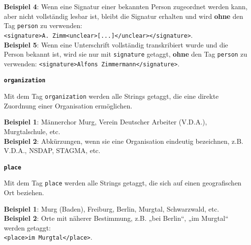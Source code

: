 \documentclass[12pt, a4paper, ngerman, bidi=default]{article}
\begin{document}
\begin{description}
    \textbf{ Beispiel 4}: Wenn eine Signatur einer bekannten Person zugeordnet werden kann, aber nicht vollständig lesbar ist, bleibt die Signatur erhalten und wird \textbf{ohne} den Tag \texttt{\colorbox{person}{person}} zu verwenden: \\ 
    \colorbox{VeryLightGray}{\texttt{\textless signature\textgreater A. Zimm\textless unclear\textgreater [...]\textless /unclear\textgreater\textless /signature\textgreater}.} \\  
    
    \textbf{ Beispiel 5}: Wenn eine Unterschrift vollständig transkribiert wurde und die Person bekannt ist, wird sie nur mit \texttt{\colorbox{signature}{signature}} getaggt, \textbf{ohne} den Tag \texttt{\colorbox{person}{person}} zu verwenden:  
    \colorbox{VeryLightGray}{\texttt{\textless signature\textgreater Alfons Zimmermann\textless /signature\textgreater}.} \\  
    
    \item \textbf{\colorbox{organization}{\texttt{organization}}}
        
    Mit dem Tag \texttt{\colorbox{organization}{organization}} werden alle Strings getaggt, die eine direkte Zuordnung einer Organisation ermöglichen.  
    
    \noindent \textbf{ Beispiel 1}: Männerchor Murg, Verein Deutscher Arbeiter (V.D.A.), Murgtalschule, etc.\\
    \textbf{ Beispiel 2}: Abkürzungen, wenn sie eine Organisation eindeutig bezeichnen, z.B. V.D.A., NSDAP, STAGMA, etc.\\
    
    \item \textbf{\colorbox{place}{\texttt{place}}}
        
    Mit dem Tag \texttt{\colorbox{place}{place}} werden alle Strings getaggt, die sich auf einen geografischen Ort beziehen.  
    
    \noindent \textbf{ Beispiel 1}: Murg (Baden), Freiburg, Berlin, Murgtal, Schwarzwald, etc.\\
    \textbf{ Beispiel 2}: Orte mit näherer Bestimmung, z.B. „bei Berlin“, „im Murgtal“ werden getaggt:  \\
    \colorbox{VeryLightGray}{\texttt{\textless place\textgreater im Murgtal\textless /place\textgreater}.} \\
    

\end{description}
\end{document}
